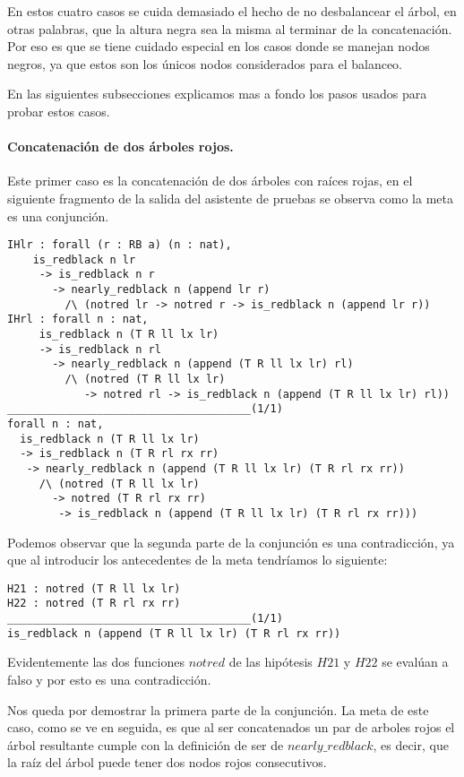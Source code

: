 En estos cuatro casos se cuida demasiado el hecho de no desbalancear el \'arbol, en otras palabras, 
que la altura negra sea la misma al terminar de la concatenaci\'on. Por eso es que se tiene cuidado
especial en los casos donde se manejan nodos negros, ya que estos son los únicos nodos
considerados para el balanceo.

En las siguientes subsecciones explicamos mas a fondo los pasos usados para probar estos casos.


\paragraph{Concatenaci\'on de dos \'arboles rojos.}

Este primer caso es la concatenaci\'on de dos \'arboles con raíces rojas, en el siguiente
fragmento de la salida del asistente de pruebas se observa como la meta es una conjunci\'on.

\begin{verbatim}
IHlr : forall (r : RB a) (n : nat),
    is_redblack n lr
     -> is_redblack n r
       -> nearly_redblack n (append lr r)
         /\ (notred lr -> notred r -> is_redblack n (append lr r))
IHrl : forall n : nat,
     is_redblack n (T R ll lx lr)
     -> is_redblack n rl
       -> nearly_redblack n (append (T R ll lx lr) rl)
         /\ (notred (T R ll lx lr)
            -> notred rl -> is_redblack n (append (T R ll lx lr) rl))
______________________________________(1/1)
forall n : nat,
  is_redblack n (T R ll lx lr)
  -> is_redblack n (T R rl rx rr)
   -> nearly_redblack n (append (T R ll lx lr) (T R rl rx rr))
     /\ (notred (T R ll lx lr)
       -> notred (T R rl rx rr)
        -> is_redblack n (append (T R ll lx lr) (T R rl rx rr)))
\end{verbatim}

Podemos observar que la segunda parte de la conjunci\'on es una contradicci\'on, ya que al
introducir los antecedentes de la meta tendríamos lo siguiente:

\begin{verbatim}
H21 : notred (T R ll lx lr)
H22 : notred (T R rl rx rr)
______________________________________(1/1)
is_redblack n (append (T R ll lx lr) (T R rl rx rr))
\end{verbatim}

Evidentemente las dos funciones $notred$ de las hip\'otesis $H21$ y $H22$ se eval\'uan a falso y por
esto es una contradicci\'on.

Nos queda por demostrar la primera parte de la conjunci\'on. La meta de este caso, como se ve en
seguida, es que al ser concatenados un par de arboles rojos el árbol resultante cumple con la
definici\'on de ser de \hyperref[inductive_isRedB]{$nearly\_redblack$}, es decir, que la raíz del 
\'arbol puede tener dos nodos rojos consecutivos.

